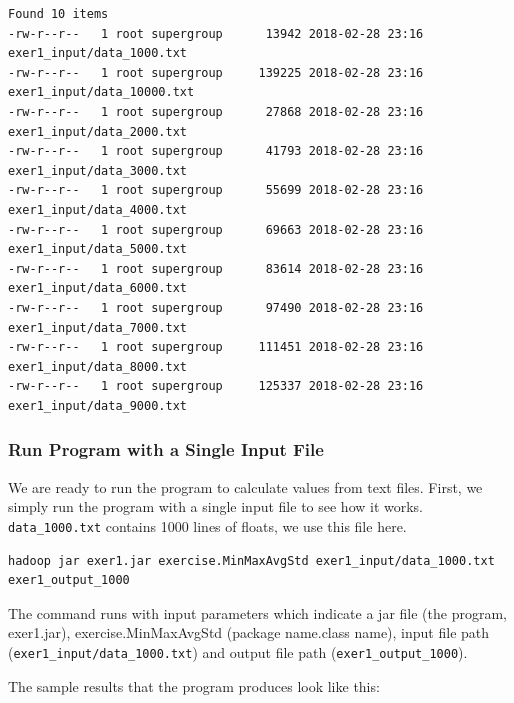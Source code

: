 \begin{lstlisting}
Found 10 items
-rw-r--r--   1 root supergroup      13942 2018-02-28 23:16 exer1_input/data_1000.txt
-rw-r--r--   1 root supergroup     139225 2018-02-28 23:16 exer1_input/data_10000.txt
-rw-r--r--   1 root supergroup      27868 2018-02-28 23:16 exer1_input/data_2000.txt
-rw-r--r--   1 root supergroup      41793 2018-02-28 23:16 exer1_input/data_3000.txt
-rw-r--r--   1 root supergroup      55699 2018-02-28 23:16 exer1_input/data_4000.txt
-rw-r--r--   1 root supergroup      69663 2018-02-28 23:16 exer1_input/data_5000.txt
-rw-r--r--   1 root supergroup      83614 2018-02-28 23:16 exer1_input/data_6000.txt
-rw-r--r--   1 root supergroup      97490 2018-02-28 23:16 exer1_input/data_7000.txt
-rw-r--r--   1 root supergroup     111451 2018-02-28 23:16 exer1_input/data_8000.txt
-rw-r--r--   1 root supergroup     125337 2018-02-28 23:16 exer1_input/data_9000.txt
\end{lstlisting}

\subsubsection{Run Program with a Single Input File}

We are ready to run the program to calculate values from text
files. First, we simply run the program with a single input file to
see how it works.  \verb|data_1000.txt| contains 1000 lines of
floats, we use this file here.

\begin{lstlisting}
hadoop jar exer1.jar exercise.MinMaxAvgStd exer1_input/data_1000.txt exer1_output_1000
\end{lstlisting}

The command runs with input parameters which indicate a jar file (the
program, exer1.jar), exercise.MinMaxAvgStd (package name.class name),
input file path (\verb|exer1_input/data_1000.txt|) and output file path
(\verb|exer1_output_1000|).

The sample results that the program produces look like this:

